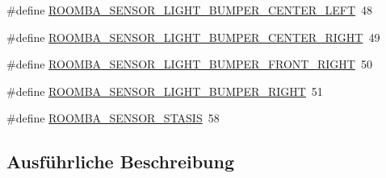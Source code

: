 \begin{DoxyCompactItemize}
\item 
\#define \hyperlink{group__roomba__sensor__extern_gaa73e909a9a5eb54d2f96663086e5069c}{R\-O\-O\-M\-B\-A\-\_\-\-S\-E\-N\-S\-O\-R\-\_\-\-L\-I\-G\-H\-T\-\_\-\-B\-U\-M\-P\-E\-R\-\_\-\-C\-E\-N\-T\-E\-R\-\_\-\-L\-E\-F\-T}~48
\item 
\#define \hyperlink{group__roomba__sensor__extern_ga1e402b25d5ee61ea168860c210684339}{R\-O\-O\-M\-B\-A\-\_\-\-S\-E\-N\-S\-O\-R\-\_\-\-L\-I\-G\-H\-T\-\_\-\-B\-U\-M\-P\-E\-R\-\_\-\-C\-E\-N\-T\-E\-R\-\_\-\-R\-I\-G\-H\-T}~49
\item 
\#define \hyperlink{group__roomba__sensor__extern_gaf4f0941fcd5728f52f3d546a5ff17eb1}{R\-O\-O\-M\-B\-A\-\_\-\-S\-E\-N\-S\-O\-R\-\_\-\-L\-I\-G\-H\-T\-\_\-\-B\-U\-M\-P\-E\-R\-\_\-\-F\-R\-O\-N\-T\-\_\-\-R\-I\-G\-H\-T}~50
\item 
\#define \hyperlink{group__roomba__sensor__extern_ga8b965879863e32e596c6e2f2121dd47b}{R\-O\-O\-M\-B\-A\-\_\-\-S\-E\-N\-S\-O\-R\-\_\-\-L\-I\-G\-H\-T\-\_\-\-B\-U\-M\-P\-E\-R\-\_\-\-R\-I\-G\-H\-T}~51
\item 
\#define \hyperlink{group__roomba__sensor__extern_gad7992ba545cbb126b26e0123e84644a9}{R\-O\-O\-M\-B\-A\-\_\-\-S\-E\-N\-S\-O\-R\-\_\-\-S\-T\-A\-S\-I\-S}~58
\end{DoxyCompactItemize}


\subsection{Ausführliche Beschreibung}


